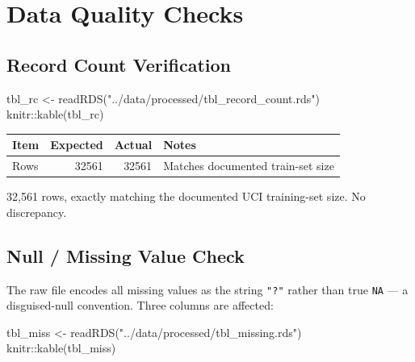 \documentclass[
  letterpaper,
  DIV=11,
  numbers=noendperiod]{scrartcl}
\newenvironment{Shaded}{\begin{snugshade}}{\end{snugshade}}
\newcommand{\FunctionTok}[1]{\textcolor[rgb]{0.28,0.35,0.67}{#1}}
\newcommand{\NormalTok}[1]{\textcolor[rgb]{0.00,0.23,0.31}{#1}}
\newcommand{\OtherTok}[1]{\textcolor[rgb]{0.00,0.23,0.31}{#1}}
\newcommand{\SpecialCharTok}[1]{\textcolor[rgb]{0.37,0.37,0.37}{#1}}
\newcommand{\StringTok}[1]{\textcolor[rgb]{0.13,0.47,0.30}{#1}}
\begin{document}
\section{Data Quality Checks}\label{data-quality-checks}

\subsection{Record Count Verification}\label{record-count-verification}

\begin{Shaded}
\begin{Highlighting}[]
\NormalTok{tbl\_rc }\OtherTok{\textless{}{-}} \FunctionTok{readRDS}\NormalTok{(}\StringTok{"../data/processed/tbl\_record\_count.rds"}\NormalTok{)}
\NormalTok{knitr}\SpecialCharTok{::}\FunctionTok{kable}\NormalTok{(tbl\_rc)}
\end{Highlighting}
\end{Shaded}

\begin{longtable}[]{@{}lrrl@{}}
\toprule\noalign{}
Item & Expected & Actual & Notes \\
\midrule\noalign{}
\endhead
\bottomrule\noalign{}
\endlastfoot
Rows & 32561 & 32561 & Matches documented train-set size \\
\end{longtable}

32,561 rows, exactly matching the documented UCI training-set size. No
discrepancy.

\subsection{Null / Missing Value Check}\label{null-missing-value-check}

The raw file encodes all missing values as the string \texttt{"?"}
rather than true \texttt{NA} --- a disguised-null convention. Three
columns are affected:

\begin{Shaded}
\begin{Highlighting}[]
\NormalTok{tbl\_miss }\OtherTok{\textless{}{-}} \FunctionTok{readRDS}\NormalTok{(}\StringTok{"../data/processed/tbl\_missing.rds"}\NormalTok{)}
\NormalTok{knitr}\SpecialCharTok{::}\FunctionTok{kable}\NormalTok{(tbl\_miss)}
\end{Highlighting}
\end{Shaded}
\end{document}
